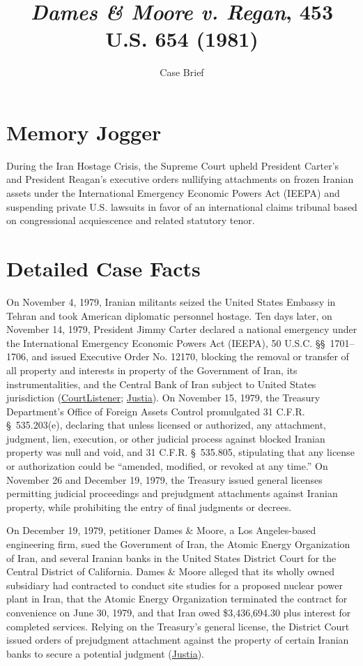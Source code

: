 \documentclass[12pt]{article}
\title{\textit{Dames \& Moore v. Regan}, 453 U.S. 654 (1981)}
\subtitle{Case Brief}
\author{}
\date{}
\begin{document}
\maketitle

\section{Memory Jogger}
During the Iran Hostage Crisis, the Supreme Court upheld President Carter's and President Reagan's executive orders nullifying attachments on frozen Iranian assets under the International Emergency Economic Powers Act (IEEPA) and suspending private U.S. lawsuits in favor of an international claims tribunal based on congressional acquiescence and related statutory tenor.

\section{Detailed Case Facts}
On November 4, 1979, Iranian militants seized the United States Embassy in Tehran and took American diplomatic personnel hostage. Ten days later, on November 14, 1979, President Jimmy Carter declared a national emergency under the International Emergency Economic Powers Act (IEEPA), 50 U.S.C. \S\S\ 1701--1706, and issued Executive Order No. 12170, blocking the removal or transfer of all property and interests in property of the Government of Iran, its instrumentalities, and the Central Bank of Iran subject to United States jurisdiction (\href{https://www.courtlistener.com/opinion/110564/dames-moore-v-regan/}{CourtListener}; \href{https://supreme.justia.com/cases/federal/us/453/654/}{Justia}). On November 15, 1979, the Treasury Department's Office of Foreign Assets Control promulgated 31 C.F.R. \S\ 535.203(e), declaring that unless licensed or authorized, any attachment, judgment, lien, execution, or other judicial process against blocked Iranian property was null and void, and 31 C.F.R. \S\ 535.805, stipulating that any license or authorization could be ``amended, modified, or revoked at any time.'' On November 26 and December 19, 1979, the Treasury issued general licenses permitting judicial proceedings and prejudgment attachments against Iranian property, while prohibiting the entry of final judgments or decrees.

On December 19, 1979, petitioner Dames \& Moore, a Los Angeles-based engineering firm, sued the Government of Iran, the Atomic Energy Organization of Iran, and several Iranian banks in the United States District Court for the Central District of California. Dames \& Moore alleged that its wholly owned subsidiary had contracted to conduct site studies for a proposed nuclear power plant in Iran, that the Atomic Energy Organization terminated the contract for convenience on June 30, 1979, and that Iran owed \$3,436,694.30 plus interest for completed services. Relying on the Treasury's general license, the District Court issued orders of prejudgment attachment against the property of certain Iranian banks to secure a potential judgment (\href{https://supreme.justia.com/cases/federal/us/453/654/}{Justia}).
\end{document}
